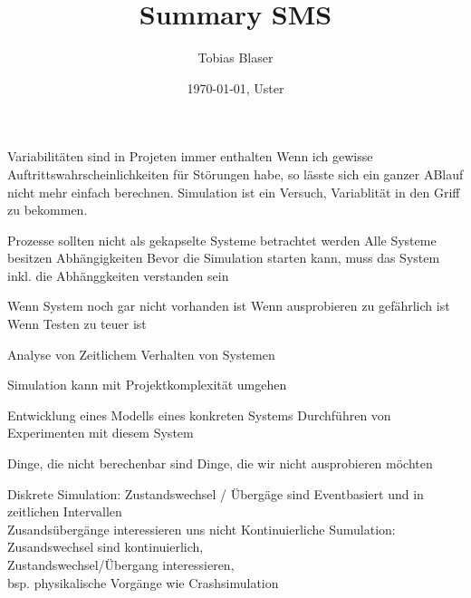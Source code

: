 \documentclass[ngerman,a4paper,12pt]{scrreprt}
\title{Summary SMS}
\author{Tobias Blaser}
\date{\today{}, Uster}
\begin{document}
\tableofcontents
\clearpage


\ul
	\li Variabilitäten sind in Projeten immer enthalten
	\li Wenn ich gewisse Auftrittswahrscheinlichkeiten für Störungen habe, so lässte sich ein ganzer ABlauf nicht mehr einfach berechnen.
	\li Simulation ist ein Versuch, Variablität in den Griff zu bekommen.
\ulE

\ul
	\li Prozesse sollten nicht als gekapselte Systeme betrachtet werden
	\li Alle Systeme besitzen Abhängigkeiten
	\li Bevor die Simulation starten kann, muss das System inkl. die Abhänggkeiten verstanden sein
\ulE

\ul
	\li Wenn System noch gar nicht vorhanden ist
	\li Wenn ausprobieren zu gefährlich ist
	\li Wenn Testen zu teuer ist
\ulE

\ul
	\li Analyse von Zeitlichem Verhalten von Systemen
\ulE

\ul
	\li Simulation kann mit Projektkomplexität umgehen
\ulE

\ul
	\li Entwicklung eines Modells eines konkreten Systems
	\li Durchführen von Experimenten mit diesem System
\ulE





\ul
	\li Dinge, die nicht berechenbar sind
	\li Dinge, die wir nicht ausprobieren möchten
\ulE

\ul
	\li Diskrete Simulation: Zustandswechsel / Übergäge sind Eventbasiert und in zeitlichen Intervallen \\ Zusandsübergänge interessieren uns nicht
	\li Kontinuierliche Sumulation: Zusandswechsel sind kontinuierlich, \\Zustandswechsel/Übergang interessieren,\\ bsp. physikalische Vorgänge wie Crashsimulation
\ulE
\end{document}
